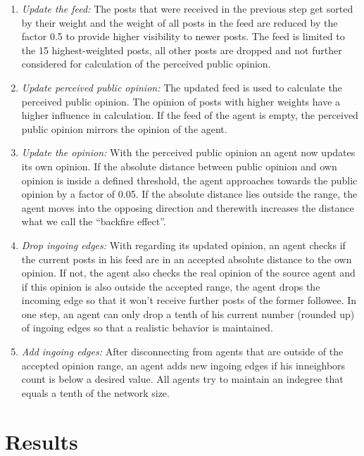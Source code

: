 \documentclass[runningheads]{llncs}
\providecommand{\tightlist}{%
  \setlength{\itemsep}{0pt}\setlength{\parskip}{0pt}}
\begin{document}
\begin{enumerate}
\def\labelenumi{\arabic{enumi}.}
\tightlist
\item
  \emph{Update the feed:} The posts that were received in the previous
  step get sorted by their weight and the weight of all posts in the
  feed are reduced by the factor 0.5 to provide higher visibility to
  newer posts. The feed is limited to the 15 highest-weighted posts, all
  other posts are dropped and not further considered for calculation of
  the perceived public opinion.
\item
  \emph{Update perceived public opinion:} The updated feed is used to
  calculate the perceived public opinion. The opinion of posts with
  higher weights have a higher influence in calculation. If the feed of
  the agent is empty, the perceived public opinion mirrors the opinion
  of the agent.
\item
  \emph{Update the opinion:} With the perceived public opinion an agent
  now updates its own opinion. If the absolute distance between public
  opinion and own opinion is inside a defined threshold, the agent
  approaches towards the public opinion by a factor of 0.05. If the
  absolute distance lies outside the range, the agent moves into the
  opposing direction and therewith increases the distance what we call
  the \enquote{backfire effect}.
\item
  \emph{Drop ingoing edges:} With regarding its updated opinion, an
  agent checks if the current posts in his feed are in an accepted
  absolute distance to the own opinion. If not, the agent also checks
  the real opinion of the source agent and if this opinion is also
  outside the accepted range, the agent drops the incoming edge so that
  it won't receive further posts of the former followee. In one step, an
  agent can only drop a tenth of his current number (rounded up) of
  ingoing edges so that a realistic behavior is maintained.
\item
  \emph{Add ingoing edges:} After disconnecting from agents that are
  outside of the accepted opinion range, an agent adds new ingoing edges
  if his inneighbors count is below a desired value. All agents try to
  maintain an indegree that equals a tenth of the network size.
\end{enumerate}

\hypertarget{results}{%
\section{Results}\label{results}}
\end{document}
